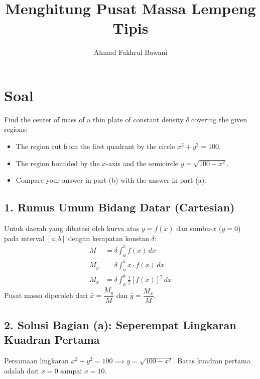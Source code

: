 \documentclass[12pt,a4paper]{article}
\title{Menghitung Pusat Massa Lempeng Tipis}
\author{Ahmad Fakhrul Bawani}
\date{}
\begin{document}
\maketitle

\section*{Soal}

Find the center of mass of a thin plate of constant density $\delta$ covering the given regions:
\begin{itemize}
  \item[\textbf{a.}] The region cut from the first quadrant by the circle $x^2 + y^2 = 100$.
  \item[\textbf{b.}] The region bounded by the $x$-axis and the semicircle $y = \sqrt{100 - x^2}$.
  \item[\textbf{c.}] Compare your answer in part (b) with the answer in part (a).
\end{itemize}

\subsection*{1. Rumus Umum Bidang Datar (Cartesian)}
Untuk daerah yang dibatasi oleh kurva atas $y = f(x)$ dan sumbu-$x$ ($y = 0$) pada interval $[a, b]$ dengan kerapatan konstan $\delta$:
\begin{align*}
  M &= \delta \int_{a}^{b} f(x) \, dx \\
  M_y &= \delta \int_{a}^{b} x \cdot f(x) \, dx \\
  M_x &= \delta \int_{a}^{b} \frac{1}{2} [f(x)]^2 \, dx
\end{align*}
Pusat massa diperoleh dari $\bar{x} = \dfrac{M_y}{M}$ dan $\bar{y} = \dfrac{M_x}{M}$.

\subsection*{2. Solusi Bagian (a): Seperempat Lingkaran Kuadran Pertama}
Persamaan lingkaran $x^2 + y^2 = 100 \implies y = \sqrt{100 - x^2}$. 
Batas kuadran pertama adalah dari $x = 0$ sampai $x = 10$.
\end{document}
